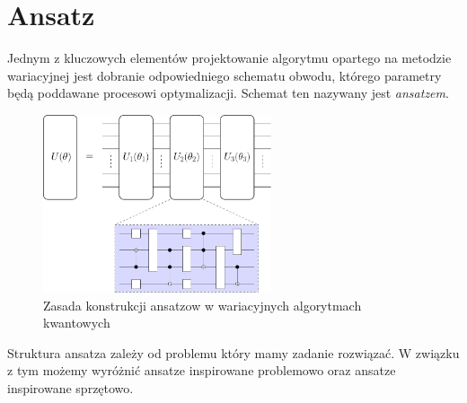 \documentclass[a4paper,11pt]{article}
\begin{document}
%

\hypertarget{typy-ansatzow}{%
	\section{Ansatz}\label{typy-ansatzow}}

Jednym z kluczowych elementów projektowanie algorytmu opartego na metodzie wariacyjnej jest dobranie odpowiedniego schematu obwodu, którego parametry będą poddawane procesowi optymalizacji. Schemat ten nazywany jest \emph{ansatzem}.


\begin{figure}[ht!]
	\centering
	\includegraphics[width=0.6\textwidth]{ansatz.pdf}
	\caption{Zasada konstrukcji ansatzow w wariacyjnych algorytmach kwantowych}
\end{figure}

Struktura ansatza zależy od problemu który mamy zadanie rozwiązać. W związku z tym możemy wyróżnić ansatze inspirowane problemowo oraz ansatze inspirowane sprzętowo.
\end{document}
